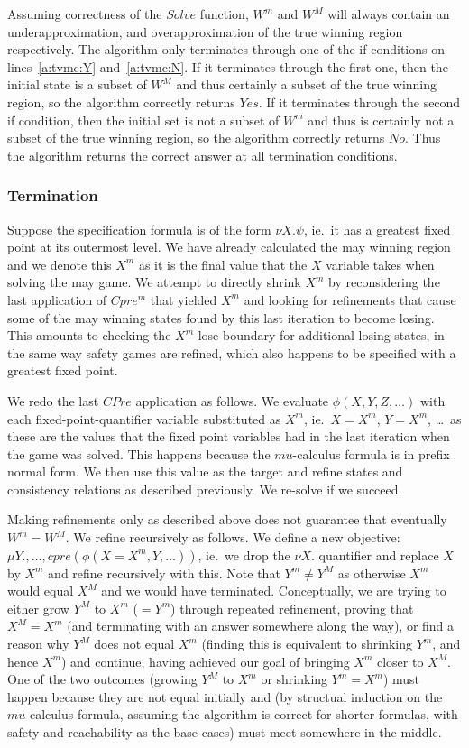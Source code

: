 Assuming correctness of the $Solve$ function, $W^m$ and $W^M$ will always contain an underapproximation, and overapproximation of the true winning region respectively. The algorithm only terminates through one of the if conditions on lines~\ref{a:tvmc:Y} and~\ref{a:tvmc:N}. If it terminates through the first one, then the initial state is a subset of $W^M$ and thus certainly a subset of the true winning region, so the algorithm correctly returns $Yes$. If it terminates through the second if condition, then the initial set is not a subset of $W^m$ and thus is certainly not a subset of the true winning region, so the algorithm correctly returns $No$. Thus the algorithm returns the correct answer at all termination conditions.

\subsubsection{Termination}

Suppose the specification formula is of the form $\nu X. \psi$, ie.\ it has a greatest fixed point at its outermost level. We have already calculated the may winning region and we denote this $X^m$ as it is the final value that the $X$ variable takes when solving the may game. We attempt to directly shrink $X^m$ by reconsidering the last application of $Cpre^m$ that yielded $X^m$ and looking for refinements that cause some of the may winning states found by this last iteration to become losing. This amounts to checking the $X^m$-lose boundary for additional losing states, in the same way safety games are refined, which also happens to be specified with a greatest fixed point.

We redo the last $CPre$ application as follows. We evaluate $\phi(X, Y, Z, \ldots)$ with each fixed-point-quantifier variable substituted as $X^m$, ie.\ $X=X^m$, $Y=X^m$, \ldots \ as these are the values that the fixed point variables had in the last iteration when the game was solved. This happens because the $mu$-calculus formula is in prefix normal form. We then use this value as the target and refine states and consistency relations as described previously. We re-solve if we succeed.

Making refinements only as described above does not guarantee that eventually $W^m = W^M$. We refine recursively as follows. We define a new objective: $\mu Y., \ldots, cpre(\phi(X=X^m, Y, \ldots))$, ie.\ we drop the $\nu X.$ quantifier and replace $X$ by $X^m$ and refine recursively with this. Note that $Y^m \neq Y^M$ as otherwise $X^m$ would equal $X^M$ and we would have terminated. Conceptually, we are trying to either grow $Y^M$ to $X^m$ ($=Y^m$) through repeated refinement, proving that $X^M = X^m$ (and terminating with an answer somewhere along the way), or find a reason why $Y^M$ does not equal $X^m$ (finding this is equivalent to shrinking $Y^m$, and hence $X^m$) and continue, having achieved our goal of bringing $X^m$ closer to $X^M$. One of the two outcomes (growing $Y^M$ to $X^m$ or shrinking $Y^m = X^m$) must happen because they are not equal initially and (by structual induction on the $mu$-calculus formula, assuming the algorithm is correct for shorter formulas, with safety and reachability as the base cases) must meet somewhere in the middle.

